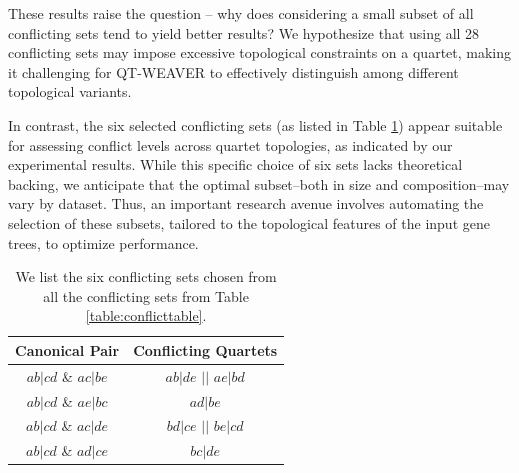 \documentclass[10pt,a4paper]{article}
\begin{document}
\begin{appendices}
These results raise the question -- why does considering a small subset of all conflicting sets tend to yield better results? We hypothesize that using all 28 conflicting sets may impose excessive topological constraints on a quartet, making it challenging for QT-WEAVER to effectively distinguish among different topological variants.

In contrast, the six selected conflicting sets (as listed in Table \ref{table:conflicttable_six}) appear suitable for assessing conflict levels across quartet topologies, as indicated by our experimental results. While this specific choice of six sets lacks theoretical backing, we anticipate that the optimal subset--both in size and composition--may vary by dataset. Thus, an important research avenue involves automating the selection of these subsets, tailored to the topological features of the input gene trees, to optimize performance.

\begin{table}[h!]
    \centering
     \renewcommand{\arraystretch}{1.2}
    \begin{tabular}{|c|c|}
        \hline
        \textbf{Canonical Pair} & \textbf{Conflicting Quartets} \\ \hline

        $ab|cd$ \& $ac|be$ 
        & $ab|de$ $||$ $ae|bd$\\ \hline

        $ab|cd$ \& $ae|bc$ 
        & $ad|be$\\ \hline

        $ab|cd$ \& $ac|de$ 
        & $bd|ce$ $||$ $be|cd$\\ \hline

        $ab|cd$ \& $ad|ce$ 
        & $bc|de$\\ \hline
        
    \end{tabular}
    \caption{We list the six conflicting sets chosen from all the conflicting sets from Table \ref{table:conflicttable}.}
    \label{table:conflicttable_six}
\end{table}






\end{appendices}
\end{document}
